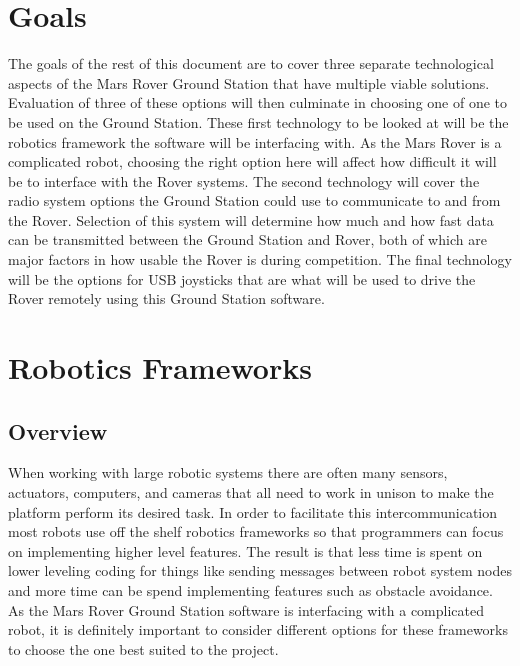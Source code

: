 \documentclass[onecolumn, draftclsnofoot, 10pt, compsoc]{IEEEtran}
\begin{document}
\section{Goals}
The goals of the rest of this document are to cover three separate technological aspects of the Mars Rover Ground Station that have multiple viable solutions. Evaluation of three of these options will then culminate in choosing one of one to be used on the Ground Station.
These first technology to be looked at will be the robotics framework the software will be interfacing with. As the Mars Rover is a complicated robot, choosing the right option here will affect how difficult it will be to interface with the Rover systems.
The second technology will cover the radio system options the Ground Station could use to communicate to and from the Rover. Selection of this system will determine how much and how fast data can be transmitted between the Ground Station and Rover, both of which are major factors in how usable the Rover is during competition.
The final technology will be the options for USB joysticks that are what will be used to drive the Rover remotely using this Ground Station software.

\section{Robotics Frameworks}
\subsection{Overview}
When working with large robotic systems there are often many sensors, actuators, computers, and cameras that all need to work in unison to make the platform perform its desired task.
In order to facilitate this intercommunication most robots use off the shelf robotics frameworks so that programmers can focus on implementing higher level features. The result is that less time is spent on lower leveling coding for things like sending messages between robot system nodes and more time can be spend implementing features such as obstacle avoidance.
As the Mars Rover Ground Station software is interfacing with a complicated robot, it is definitely important to consider different options for these frameworks to choose the one best suited to the project.
\end{document}
